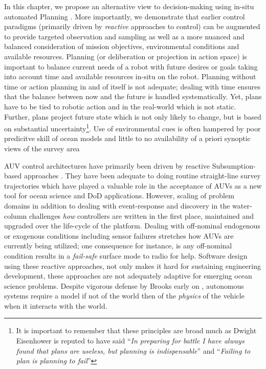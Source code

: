 In this chapter, we propose an alternative view to decision-making
using in-situ automated Planning \cite{ghallab04}. More importantly,
we demonstrate that earlier control paradigms (primarily driven by
\emph{reactive} approaches to control) can be augmented to provide
targeted observation and sampling as well as a more nuanced and
balanced consideration of mission objectives, environmental conditions
and available resources. Planning (or deliberation or projection in
action space) is important to balance current needs of a robot with
future desires or goals taking into account time and available
resources in-situ on the robot. Planning without time or action
planning in and of itself is not adequate; dealing with time ensures
that the balance between now and the future is handled
systematically. Yet, plans have to be tied to robotic action and in
the real-world which is not static. Further, plans project future
state which is not only likely to change, but is based on substantial
uncertainty\footnote{It is important to remember that these principles
  are broad much as Dwight Eisenhower is reputed to have said
  ``\emph{In preparing for battle I have always found that plans are
    useless, but planning is indispensable}'' and ``\emph{Failing to
    plan is planning to fail}''}. Use of environmental cues is often
hampered by poor predicitve skill of ocean models and little to no
availability of a priori synoptic views of the survey area

AUV control architectures have primarily been driven by reactive
Subsumption-based approaches \cite{brooks86}. They have been adequate
to doing routine straight-line survey trajectories which have played a
valuable role in the acceptance of AUVs as a new tool for ocean
science and DoD applications. However, scaling of problem domains in
addition to dealing with event-response and discovery in the
water-column challenges \emph{how} controllers are written in the
first place, maintained and upgraded over the life-cycle of the
platform. Dealing with off-nominal endogenous or exogenous conditions
including sensor failures stretches how AUVs are currently being
utilized; one consequence for instance, is any off-nominal condition
results in a \emph{fail-safe} surface mode to radio for help. Software
design using these reactive approaches, not only makes it hard for
sustaining engineering development, these approaches are not
adequately adaptive for emerging ocean science problems.  Despite
vigorous defense by Brooks early on
\cite{Brooks91intelligencewithoutrea,Brooks91intelligencewithoutrep},
autonomous systems require a model if not of the world then of the
\emph{physics} of the vehicle when it interacts with the world.



